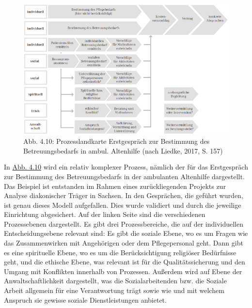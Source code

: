\documentclass[
  letterpaper,
]{book}
\begin{document}
\begin{figure}

\includegraphics[width=0.8\linewidth,height=\textheight,keepaspectratio]{images/figure410.png} \hfill{}

\caption{Abb. 4.10: Prozesslandkarte Erstgespräch zur Bestimmung des
Betreuungsbedarfs in ambul. Altenhilfe (nach Liedke, 2017, S. 157)}

\end{figure}%

In \hyperref[figure410]{Abb. 4.10} wird ein relativ komplexer Prozess,
nämlich der für das Erstgespräch zur Bestimmung des Betreuungsbedarfs in
der ambulanten Altenhilfe dargestellt. Das Beispiel ist entstanden im
Rahmen eines zurückliegenden Projekts zur Analyse diakonischer Träger in
Sachsen. In den Gesprächen, die geführt wurden, ist genau dieses Modell
aufgefallen. Dies wurde validiert und durch die jeweilige Einrichtung
abgesichert. Auf der linken Seite sind die verschiedenen Prozessebenen
dargestellt. Es gibt drei Prozessbereiche, die auf der individuellen
Entscheidungsebene relevant sind: Es gibt die soziale Ebene, wo es um
Fragen wie das Zusammenwirken mit Angehörigen oder dem Pflegepersonal
geht. Dann gibt es eine spirituelle Ebene, wo es um die Berücksichtigung
religiöser Bedürfnisse geht, und die ethische Ebene, was relevant ist
für die Qualitätssicherung und den Umgang mit Konflikten innerhalb von
Prozessen. Außerdem wird auf Ebene der Anwaltschaftlichkeit dargestellt,
was die Sozialarbeitenden bzw. die Soziale Arbeit allgemein für eine
Verantwortung trägt sowie wie und mit welchem Anspruch sie gewisse
soziale Dienstleistungen anbietet.
\end{document}
